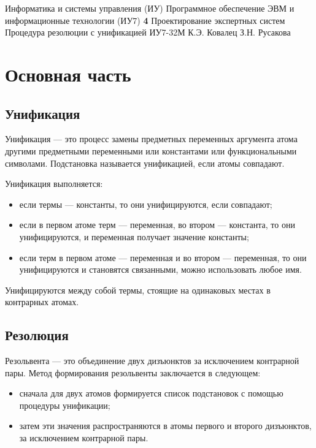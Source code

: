 \documentclass{bmstu}
\begin{document}
\makereporttitle
{Информатика и системы управления (ИУ)}
{Программное обеспечение ЭВМ и информационные технологии (ИУ7)}
{\textbf{4}}
{Проектирование экспертных систем}
{Процедура резолюции с унификацией}
{}
{ИУ7-32М}
{К.Э. Ковалец}
{З.Н. Русакова}


\setcounter{page}{2}
\renewcommand{\contentsname}{Содержание} 
\tableofcontents


\chapter{Основная часть}

\section{Унификация}

Унификация --- это процесс замены предметных переменных аргумента атома другими предметными переменными или константами или функциональными символами. Подстановка называется унификацией, если атомы совпадают.

Унификация выполняется:
\begin{itemize}
    \item если термы --- константы, то они унифицируются, если совпадают;
    \item если в первом атоме терм --- переменная, во втором --- константа, то они унифицируются, и переменная получает значение константы;
    \item если терм в первом атоме --- переменная и во втором --- переменная, то они унифицируются и становятся связанными, можно использовать любое имя.
\end{itemize}

Унифицируются между собой термы, стоящие на одинаковых местах в контрарных атомах.

\section{Резолюция}

Резольвента --- это объединение двух дизъюнктов за исключением контрарной пары.
Метод формирования резольвенты заключается в следующем:
\begin{itemize}
    \item сначала для двух атомов формируется список подстановок с помощью процедуры унификации;
    \item затем эти значения распространяются в атомы первого и второго дизъюнктов,
    за исключением контрарной пары.
\end{itemize}
\end{document}
